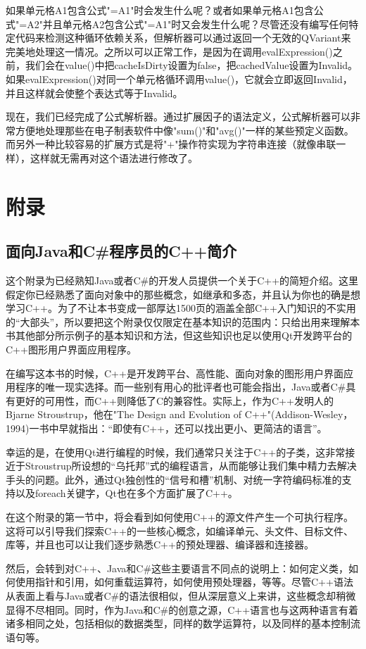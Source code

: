 \documentclass[11pt,oneside]{book}
\begin{document}
\begin{common-format}
如果单元格A1包含公式"=A1"时会发生什么呢？或者如果单元格A1包含公式"=A2"并且单元格A2包含公式"=A1"时又会发生什么呢？尽管还没有编写任何特定代码来检测这种循环依赖关系，但解析器可以通过返回一个无效的QVariant来完美地处理这一情况。之所以可以正常工作，是因为在调用evalExpression()之前，我们会在value()中把cacheIsDirty设置为false，把cachedValue设置为Invalid。如果evalExpression()对同一个单元格循环调用value()，它就会立即返回Invalid，并且这样就会使整个表达式等于Invalid。

现在，我们已经完成了公式解析器。通过扩展因子的语法定义，公式解析器可以非常方便地处理那些在电子制表软件中像"sum()"和"avg()"一样的某些预定义函数。而另外一种比较容易的扩展方式是将"+"操作符实现为字符串连接（就像串联一样），这样就无需再对这个语法进行修改了。


\appendix

\part{附录}
\chapter{面向Java和C\#{}程序员的C++简介}
这个附录为已经熟知Java或者C\#{}的开发人员提供一个关于C++的简短介绍。这里假定你已经熟悉了面向对象中的那些概念，如继承和多态，并且认为你也的确是想学习C++。为了不让本书变成一部厚达1500页的涵盖全部C++入门知识的不实用的“大部头”，所以要把这个附录仅仅限定在基本知识的范围内：只给出用来理解本书其他部分所示例子的基本知识和方法，但这些知识也足以使用Qt开发跨平台的C++图形用户界面应用程序。

在编写这本书的时候，C++是开发跨平台、高性能、面向对象的图形用户界面应用程序的唯一现实选择。而一些别有用心的批评者也可能会指出，Java或者C\#{}具有更好的可用性，而C++则降低了C的兼容性。实际上，作为C++发明人的Bjarne Stroustrup，他在"The Design and Evolution of C++"(Addison-Wesley，1994)一书中早就指出：“即使有C++，还可以找出更小、更简洁的语言”。

幸运的是，在使用Qt进行编程的时候，我们通常只关注于C++的子类，这非常接近于Stroustrup所设想的“乌托邦”式的编程语言，从而能够让我们集中精力去解决手头的问题。此外，通过Qt独创性的“信号和槽”机制、对统一字符编码标准的支持以及foreach关键字，Qt也在多个方面扩展了C++。

在这个附录的第一节中，将会看到如何使用C++的源文件产生一个可执行程序。这将可以引导我们探索C++的一些核心概念，如编译单元、头文件、目标文件、库等，并且也可以让我们逐步熟悉C++的预处理器、编译器和连接器。

然后，会转到对C++、Java和C\#{}这些主要语言不同点的说明上：如何定义类，如何使用指针和引用，如何重载运算符，如何使用预处理器，等等。尽管C++语法从表面上看与Java或者C\#{}的语法很相似，但从深层意义上来讲，这些概念却稍微显得不尽相同。同时，作为Java和C\#{}的创意之源，C++语言也与这两种语言有着诸多相同之处，包括相似的数据类型，同样的数学运算符，以及同样的基本控制流语句等。


\end{common-format}
\end{document}
